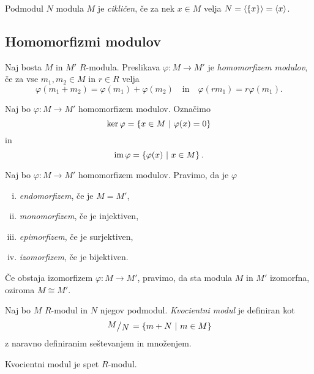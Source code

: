 \begin{definicija}
Podmodul $N$ modula $M$ je \emph{cikličen},
če za nek $x \in M$ velja $N = \left\langle \left\{x\right\}\right\rangle = \left\langle x\right\rangle$.
\end{definicija}

\newpage

\subsection{Homomorfizmi modulov}

\begin{definicija}
Naj bosta $M$ in $M'$ $R$-modula. Preslikava
$\varphi \colon M \to M'$ je
\emph{homomorfizem modulov}, če za vse
$m_1, m_2 \in M$ in $r \in R$ velja
\[
\varphi(m_1 + m_2) = \varphi(m_1) + \varphi(m_2)
\quad \text{in} \quad
\varphi(r m_1) = r \varphi(m_1).
\]
\end{definicija}

\begin{definicija}
Naj bo $\varphi \colon M \to M'$ homomorfizem modulov. Označimo
\[
\ker \varphi = \left\{x \in M~\middle\vert~\varphi(x) = 0\right\}
\]
in
\[
\operatorname{im} \varphi = \left\{\varphi(x)~\middle\vert~x \in M\right\}.
\]
\end{definicija}

\begin{definicija}
Naj bo $\varphi \colon M \to M'$ homomorfizem modulov. Pravimo, da
je $\varphi$

\begin{enumerate}[i)]
\item \emph{endomorfizem}, če je $M = M'$,
\item \emph{monomorfizem}, če je injektiven,
\item \emph{epimorfizem}, če je surjektiven,
\item \emph{izomorfizem}, če je bijektiven.
\end{enumerate}

Če obstaja izomorfizem $\varphi \colon M \to M'$, pravimo, da sta
modula $M$ in $M'$ izomorfna, oziroma $M \cong M'$.
\end{definicija}

\begin{definicija}
Naj bo $M$ $R$-modul in $N$ njegov podmodul.
\emph{Kvocientni modul} je definiran kot
\[
\kvoc{M}{N} = \setb{m+N}{m \in M}
\]
z naravno definiranim seštevanjem in množenjem.
\end{definicija}

\begin{opomba}
Kvocientni modul je spet $R$-modul.
\end{opomba}

